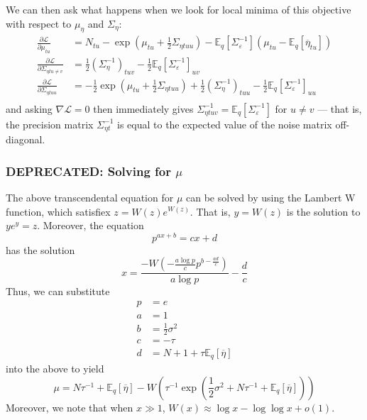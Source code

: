 \documentclass[11pt]{article}
\begin{document}
We can then ask what happens when we look for local minima of this objective with respect to $\mu_\eta$ and $\Sigma_\eta$:
\begin{align}
    \frac{\partial \mathcal{L}}{\partial \mu_{tu}} &=
    N_{tu} - \exp\left(\mu_{tu} + \frac{1}{2} \Sigma_{\eta tuu} \right)
    - \mathbb{E}_q[\Sigma_\varepsilon^{-1}](\mu_{tu} - \mathbb{E}_q[\overline{\eta}_{tu}]) \\
    \frac{\partial \mathcal{L}}{\partial \Sigma_{\eta tu \neq v}} &=
    \frac{1}{2} \left(\Sigma^{-1}_\eta \right)_{tuv}
    -\frac{1}{2}\mathbb{E}_q[\Sigma_\varepsilon^{-1}]_{uv}\\
    \frac{\partial \mathcal{L}}{\partial \Sigma_{\eta tuu}} &=
    -\frac{1}{2} \exp\left(\mu_{tu} + \frac{1}{2} \Sigma_{\eta tuu} \right)
    + \frac{1}{2} \left(\Sigma^{-1}_\eta \right)_{tuu}
    -\frac{1}{2}\mathbb{E}_q[\Sigma_\varepsilon^{-1}]_{uu} \\
\end{align}
and asking $\nabla \mathcal{L} = 0$ then immediately gives $\Sigma^{-1}_{\eta tuv} = \mathbb{E}_q[\Sigma_\varepsilon^{-1}]$ for $u\neq v$ --- that is, the precision matrix $\Sigma^{-1}_{\eta t}$ is equal to the expected value of the noise matrix off-diagonal.

\subsubsection{DEPRECATED: Solving for $\mu$}
The above transcendental equation for $\mu$ can be solved by using the Lambert W function, which satisfiex $z = W(z)e^{W(z)}$. That is, $y = W(z)$ is the solution to $ye^y = z$. Moreover, the equation
\begin{equation}
    p^{ax + b} = cx + d
\end{equation}
has the solution
\begin{equation}
    x = \frac{-W\left(-\frac{a \log p}{c}
    p^{b - \frac{ad}{c}} \right)}{a \log p} - \frac{d}{c}
\end{equation}
Thus, we can substitute
\begin{align}
    p &= e \\
    a &= 1 \\
    b &= \frac{1}{2} \sigma^2 \\
    c &= -\tau \\
    d &= N + 1 + \tau \mathbb{E}_q[\overline{\eta}]
\end{align}
into the above to yield
\begin{equation}
    \mu = N\tau^{-1} + \mathbb{E}_q[\overline{\eta}] -
    W\left(\tau^{-1} \exp \left(
    \frac{1}{2}\sigma^2 + N\tau^{-1} + \mathbb{E}_q[\overline{\eta}]
    \right)\right)
\end{equation}
Moreover, we note that when $x \gg 1$, $W(x) \approx \log x - \log \log x + o(1)$.
\end{document}
